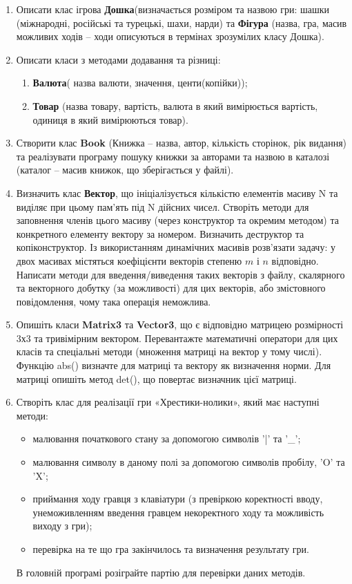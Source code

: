 \documentclass[a5paper,titlepage,openany,twoside,draft]{book_unv}%
\makeatletter
\newcommand{\xslalph}[1]{\expandafter\@xslalph\csname c@#1\endcsname}
\newcommand{\@xslalph}[1]{%
    \ifcase#1\or а\or б\or в\or г\or д\or e\or є\or ж\or з\or i%
    \or й\or к\or л\or м\or н\or о\or п\or р\or с\or т%
    \or у\or ф\or х\or ц\or ч\or ш\or ю\or я\or аа\or бб\or вв%
    \else\@ctrerr\fi%
}
\makeatother
\begin{document}
\begin{enumerate}
\item
  Описати клас ігрова \textbf{Дошка}(визначається розміром та назвою
  гри: шашки (міжнародні, російські та турецькі, шахи, нарди) та
  \textbf{Фігура} (назва, гра, масив можливих ходів -- ходи описуються в
  термінах зрозумілих класу Дошка).

\item
  Описати класи з методами додавання та різниці:
\begin{enumerate}[label=\xslalph*)]
\item \textbf{Валюта}( назва валюти, значення, центи(копійки));
\item \textbf{Товар} (назва товару, вартість, валюта в який вимірюється
вартість, одиниця в який вимірюються товар).
\end{enumerate}

\item
  Створити клас \textbf{Book} (Книжка -- назва, автор, кількість сторінок, рік
  видання) та реалізувати програму пошуку книжки за авторами та назвою в
  каталозі (каталог -- масив книжок, що зберігається у файлі).
  
\item
  Визначить клас \textbf{Вектор}, що ініціалізується кількістю елементів масиву N
  та виділяє при цьому пам'ять під N дійсних чисел. Створіть методи для
  заповнення членів цього масиву (через конструктор та окремим методом)
  та конкретного елементу вектору за номером. Визначить деструктор та
  копіконструктор. Із використанням динамічних масивів розв'язати
  задачу: у двох масивах містяться коефіцієнти векторів степеню $m$ і $n$
  відповідно. Написати методи для введення/виведення таких векторів з файлу,
  скалярного та векторного добутку (за можливості) для цих векторів, або
 змістовного повідомлення, чому така операція неможлива.
 
\item
  Опишіть класи \textbf{Matrix3} та \textbf{Vector3}, що є відповідно матрицею розмірності
  3х3 та тривімірним вектором. Перевантажте математичні оператори для
  цих класів та спеціальні методи (множення матриці на вектор у тому
  числі). Функцію abs() визначте для матриці та вектору як визначення
  норми. Для матриці опишіть метод det(), що повертає визначник цієї
  матриці.

\item
Створіть клас для реалізації гри «Хрестики-нолики», який має наступні методи: 
\begin{itemize}
\item
малювання початкового стану за допомогою символів '|' та '\_'; 
\item
малювання символу в даному полі за допомогою символів пробілу, 'O' та 'X'; 
\item
приймання ходу гравця з клавіатури (з превіркою коректності вводу, 
унеможивленням введення гравцем некоректного ходу та можливість виходу з гри);
\item
перевірка на те що гра закінчилось та визначення результату гри. 
\end{itemize}
В головній програмі розіграйте партію для перевірки даних методів.


\end{enumerate}
\end{document}
